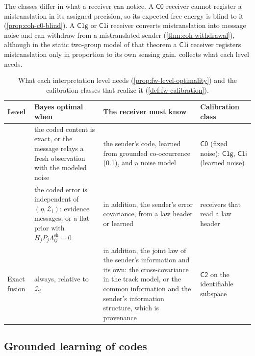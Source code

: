 The classes differ in what a receiver can notice. A $\mathsf{C0}$ receiver cannot register a mistranslation in its assigned precision, so its expected free energy is blind to it (\cref{prop:coh-c0-blind}). A $\mathsf{C1g}$ or $\mathsf{C1i}$ receiver converts mistranslation into message noise and can withdraw from a mistranslated sender (\cref{thm:coh-withdrawal}), although in the static two-group model of that theorem a $\mathsf{C1i}$ receiver registers mistranslation only in proportion to its own sensing gain.  collects what each level needs.

\begin{table}[t]
\centering
\small
\begin{tabular}{@{}>{\raggedright\arraybackslash}p{1.8cm}>{\raggedright\arraybackslash}p{4.3cm}>{\raggedright\arraybackslash}p{5.2cm}>{\raggedright\arraybackslash}p{3.0cm}@{}}
\toprule
Level & Bayes optimal when & The receiver must know & Calibration class\\
\midrule
0 & the coded content is exact, or the message relays a fresh observation with the modeled noise & the sender's code, learned from grounded co-occurrence (\cref{sec:fw-learning}), and a noise model & $\mathsf{C0}$ (fixed noise); $\mathsf{C1g}$, $\mathsf{C1i}$ (learned noise)\\
1 & the coded error is independent of $(\eta,\mathcal Z_i)$: evidence messages, or a flat prior with $H_jP_j\Lambda^{\mathrm{sh}}_{ij}=0$ & in addition, the sender's error covariance, from a law header or learned & receivers that read a law header\\
Exact fusion & always, relative to $\mathcal Z_i$ & in addition, the joint law of the sender's information and its own: the cross-covariance in the track model, or the common information and the sender's information structure, which is provenance & $\mathsf{C2}$ on the identifiable subspace\\
\bottomrule
\end{tabular}
\caption{What each interpretation level needs (\cref{prop:fw-level-optimality}) and the calibration classes that realize it (\cref{def:fw-calibration}).}
\label{tab:fw-levels}
\end{table}

\subsection{Grounded learning of codes}\label{sec:fw-learning}

